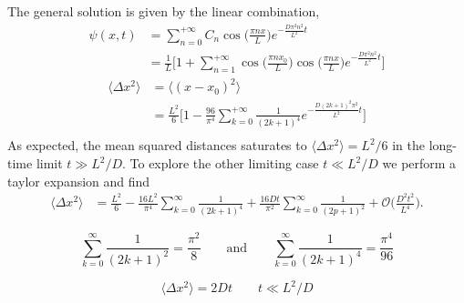 The general solution is given by the linear combination,
\begin{align*}
  \psi(x,t) &= \sum_{n=0}^{+\infty} C_n \cos\Big(\frac{\pi n x}{L}\Big) e^{- \frac{D\pi^2
  n^2}{L^2}t}\\
            &=\frac{1}{L} \Bigg[ 1 + \sum_{n=1}^{+\infty} \cos\Big(\frac{\pi n
  x_0}{L}\Big) \cos\Big(\frac{\pi n x}{L}\Big) e^{- \frac{D\pi^2  n^2}{L^2}t}\Bigg]
\end{align*}
\begin{align*}
  \langle \Delta x^2 \rangle &= \langle(x-x_0)^2\rangle\\&= \frac{L^2}{6}\Bigg[1 -
  \frac{96}{\pi^4}
  \sum_{k=0}^{+\infty} \frac{1}{(2k+1)^4} e^{- \frac{D(2k+1)^2 \pi^2}{L^2}t}\Bigg]\\
\end{align*}
As expected, the mean squared distances saturates to $\langle \Delta x^2 \rangle = L^2/6$
in the long-time limit $t \gg L^2 / D.$ To explore the other limiting case $t \ll L^2/D
$ we perform a taylor expansion and find
\begin{align*}
  \langle \Delta x^2 \rangle &= \frac{L^2}{6} - \frac{16 L^2}{\pi^4} \sum_{k=0}^{\infty}
  \frac{1}{(2k+1)^4} + \frac{16 D t}{\pi^2} \sum_{k=0}^{\infty} \frac{1}{(2p+1)^2} +
  \mathcal{O}\bigg(\frac{D^2 t^2}{L^4}\bigg).
\end{align*}

\cite{BICKEL200724}

\begin{equation*}
  \sum_{k=0}^{\infty} \frac{1}{(2k+1)^2} = \frac{\pi^2}{8} \qquad \text{and} \qquad
  \sum_{k=0}^{\infty} \frac{1}{(2k+1)^4} = \frac{\pi^4}{96}
\end{equation*}

\begin{equation*}
\langle \Delta x^2 \rangle = 2Dt \qquad t \ll L^2/D
\end{equation*}
